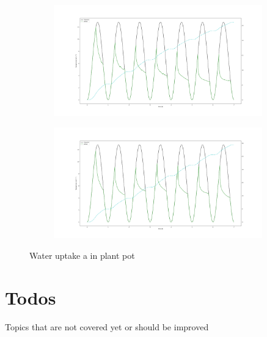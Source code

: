 \begin{figure}
\begin{subfigure}[c]{1\textwidth}
\includegraphics[width=0.99\textwidth]{example7c_no_hydro.png}
 \label{fig:example7c}
\end{subfigure}
\begin{subfigure}[c]{1\textwidth}
\includegraphics[width=0.99\textwidth]{example7c_simple_hydro.png}
 \label{fig:example7c_hydro}
\end{subfigure}
\caption{Water uptake a in plant pot} \label{fig:example7c}
\end{figure}







\newpage
\section{Todos}
Topics that are not covered yet or should be improved

